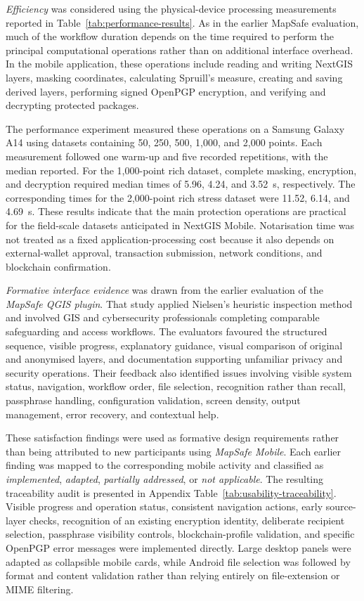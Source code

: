 \documentclass[]{interact}
\begin{document}
\textit{Efficiency} was considered using the physical-device processing measurements reported in Table~\ref{tab:performance-results}. As in the earlier MapSafe evaluation, much of the workflow duration depends on the time required to perform the principal computational operations rather than on additional interface overhead. In the mobile application, these operations include reading and writing NextGIS layers, masking coordinates, calculating Spruill's measure, creating and saving derived layers, performing signed OpenPGP encryption, and verifying and decrypting protected packages.

The performance experiment measured these operations on a Samsung Galaxy A14 using datasets containing 50, 250, 500, 1,000, and 2,000 points. Each measurement followed one warm-up and five recorded repetitions, with the median reported. For the 1,000-point rich dataset, complete masking, encryption, and decryption required median times of 5.96, 4.24, and 3.52~s, respectively. The corresponding times for the 2,000-point rich stress dataset were 11.52, 6.14, and 4.69~s. These results indicate that the main protection operations are practical for the field-scale datasets anticipated in NextGIS Mobile. Notarisation time was not treated as a fixed application-processing cost because it also depends on external-wallet approval, transaction submission, network conditions, and blockchain confirmation.

\textit{Formative interface evidence} was drawn from the earlier evaluation of the \textit{MapSafe QGIS plugin}. That study applied Nielsen's heuristic inspection method \citep{nielsen1995conduct} and involved GIS and cybersecurity professionals completing comparable safeguarding and access workflows. The evaluators favoured the structured sequence, visible progress, explanatory guidance, visual comparison of original and anonymised layers, and documentation supporting unfamiliar privacy and security operations. Their feedback also identified issues involving visible system status, navigation, workflow order, file selection, recognition rather than recall, passphrase handling, configuration validation, screen density, output management, error recovery, and contextual help.

These satisfaction findings were used as formative design requirements rather than being attributed to new participants using \textit{MapSafe Mobile}. Each earlier finding was mapped to the corresponding mobile activity and classified as \emph{implemented}, \emph{adapted}, \emph{partially addressed}, or \emph{not applicable}. The resulting traceability audit is presented in Appendix Table~\ref{tab:usability-traceability}. Visible progress and operation status, consistent navigation actions, early source-layer checks, recognition of an existing encryption identity, deliberate recipient selection, passphrase visibility controls, blockchain-profile validation, and specific OpenPGP error messages were implemented directly. Large desktop panels were adapted as collapsible mobile cards, while Android file selection was followed by format and content validation rather than relying entirely on file-extension or MIME filtering.
\end{document}

